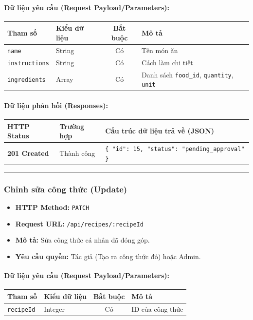 \documentclass[12pt,a4paper]{article}
\begin{document}
\paragraph{Dữ liệu yêu cầu (Request Payload/Parameters):}
\begin{longtable}{|p{2.8cm}|p{2.2cm}|c|p{7.0cm}|}
\hline
\textbf{Tham số} & \textbf{Kiểu dữ liệu} & \textbf{Bắt buộc} & \textbf{Mô tả} \\ \hline
\endhead
\texttt{name} & String & Có & Tên món ăn \\ \hline
\texttt{instructions} & String & Có & Cách làm chi tiết \\ \hline
\texttt{ingredients} & Array & Có & Danh sách \texttt{food\_id}, \texttt{quantity}, \texttt{unit} \\ \hline
\end{longtable}

\paragraph{Dữ liệu phản hồi (Responses):}
\begin{longtable}{|p{2.8cm}|p{3.2cm}|p{8.0cm}|}
\hline
\textbf{HTTP Status} & \textbf{Trường hợp} & \textbf{Cấu trúc dữ liệu trả về (JSON)} \\ \hline
\endhead
\textbf{201 Created} & Thành công & \texttt{\{ "id": 15, "status": "pending\_approval" \}} \\ \hline
\end{longtable}

\vskip 0.4cm
\noindent\rule{\textwidth}{0.3pt}
\vskip 0.4cm

\subsubsection{Chỉnh sửa công thức (Update)}
\begin{itemize}[leftmargin=*]
    \item \textbf{HTTP Method:} \texttt{PATCH}
    \item \textbf{Request URL:} \texttt{/api/recipes/:recipeId}
    \item \textbf{Mô tả:} Sửa công thức cá nhân đã đóng góp.
    \item \textbf{Yêu cầu quyền:} Tác giả (Tạo ra công thức đó) hoặc Admin.
\end{itemize}

\paragraph{Dữ liệu yêu cầu (Request Payload/Parameters):}
\begin{longtable}{|p{2.8cm}|p{2.2cm}|c|p{7.0cm}|}
\hline
\textbf{Tham số} & \textbf{Kiểu dữ liệu} & \textbf{Bắt buộc} & \textbf{Mô tả} \\ \hline
\endhead
\texttt{recipeId} & Integer & Có & ID của công thức \\ \hline
\end{longtable}
\end{document}
